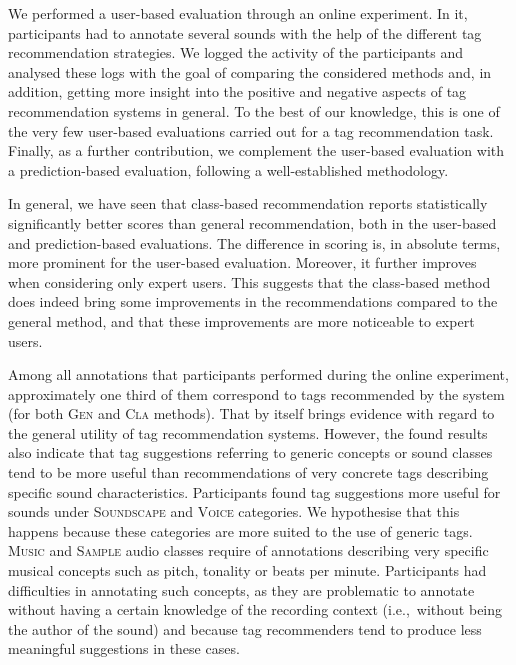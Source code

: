We performed a user-based evaluation through an online experiment. In it, participants had to annotate several sounds with the help of the different tag recommendation strategies. We logged the activity of the participants and analysed these logs with the goal of comparing the considered methods and, in addition, getting more insight into the positive and negative aspects of tag recommendation systems in general. To the best of our knowledge, this is one of the very few user-based evaluations carried out for a tag recommendation task. Finally, as a further contribution, we complement the user-based evaluation with a prediction-based evaluation, following a well-established methodology.

In general, we have seen that class-based recommendation reports statistically significantly better scores than general recommendation, both in the user-based and prediction-based evaluations. The difference in scoring is, in absolute terms, more prominent for the user-based evaluation. Moreover, it further improves when considering only expert users. This suggests that the class-based method does indeed bring some improvements in the recommendations compared to the general method, and that these improvements are more noticeable to expert users.

Among all annotations that participants performed during the online experiment, approximately one third of them correspond to tags recommended by the system (for both \textsc{Gen} and \textsc{Cla} methods). That by itself brings evidence with regard to the general utility of tag recommendation systems. However, the found results also indicate that tag suggestions referring to generic concepts or sound classes tend to be more useful than recommendations of very concrete tags describing specific sound characteristics. Participants found tag suggestions more useful for sounds under \textsc{Soundscape} and \textsc{Voice} categories. We hypothesise that this happens because these categories are more suited to the use of generic tags. \textsc{Music} and \textsc{Sample} audio classes require of annotations describing very specific musical concepts such as pitch, tonality or beats per minute. Participants had difficulties in annotating such concepts, as they are problematic to annotate without having a certain knowledge of the recording context (i.e.,~without being the author of the sound) and because tag recommenders tend to produce less meaningful suggestions in these cases. %


